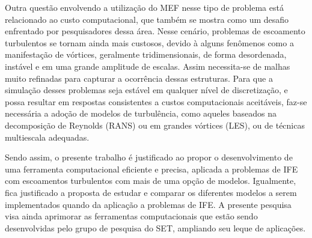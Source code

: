Outra questão envolvendo a utilização do MEF nesse tipo de problema está relacionado ao custo computacional, que também se mostra como um desafio enfrentado por pesquisadores dessa área. Nesse cenário, problemas de escoamento turbulentos se tornam ainda mais custosos, devido à alguns fenômenos como a manifestação de vórtices, geralmente tridimensionais, de forma desordenada, instável e em uma grande amplitude de escalas. Assim necessita-se de malhas muito refinadas para capturar a ocorrência dessas estruturas. Para que a simulação desses problemas seja estável em qualquer nível de discretização, e possa resultar em respostas consistentes a custos computacionais aceitáveis, faz-se necessária a adoção de modelos de turbulência, como  aqueles baseados na decomposição de Reynolds (RANS) ou em grandes vórtices (LES), ou de técnicas multiescala adequadas.

Sendo assim, o presente trabalho é justificado ao propor o desenvolvimento de uma ferramenta computacional eficiente e precisa, aplicada a problemas de IFE com escoamentos turbulentos com mais de uma opção de modelos. Igualmente, fica justificado a proposta de estudar e comparar os diferentes modelos a serem implementados quando da aplicação a problemas de IFE. A presente pesquisa visa ainda aprimorar as ferramentas computacionais que estão sendo desenvolvidas pelo grupo de pesquisa do SET, ampliando seu leque de aplicações.